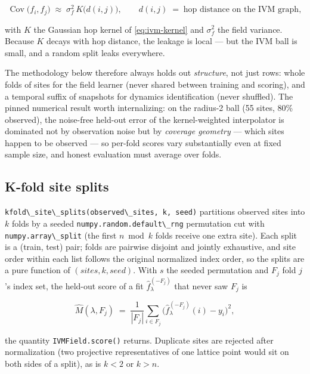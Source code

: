 \documentclass[
  10pt,
]{article}
\newcommand{\passthrough}[1]{#1}
\begin{document}
\begin{equation}
\label{eq:learn-correlation}
\operatorname{Cov}\bigl(f_i, f_j\bigr) \;\approx\; \sigma_f^{2}\,
K\bigl(d(i,j)\bigr),
\qquad d(i,j) \;=\; \text{hop distance on the IVM graph},
\end{equation}

with \(K\) the Gaussian hop kernel of \eqref{eq:ivm-kernel} and
\(\sigma_f^2\) the field variance. Because \(K\) decays with hop
distance, the leakage is local --- but the IVM ball is small, and a
random split leaks everywhere.

The methodology below therefore always holds out \emph{structure}, not
just rows: whole folds of sites for the field learner (never shared
between training and scoring), and a temporal suffix of snapshots for
dynamics identification (never shuffled). The pinned numerical result
worth internalizing: on the radius-2 ball (55 sites, 80\% observed), the
noise-free held-out error of the kernel-weighted interpolator is
dominated not by observation noise but by \emph{coverage geometry} ---
which sites happen to be observed --- so per-fold scores vary
substantially even at fixed sample size, and honest evaluation must
average over folds.

\subsection{K-fold site splits}\label{k-fold-site-splits}

\passthrough{\lstinline!kfold\_site\_splits(observed\_sites, k, seed)!}
partitions observed sites into \(k\) folds by a seeded
\passthrough{\lstinline!numpy.random.default\_rng!} permutation cut with
\passthrough{\lstinline!numpy.array\_split!} (the first \(n \bmod k\)
folds receive one extra site). Each split is a (train, test) pair; folds
are pairwise disjoint and jointly exhaustive, and site order within each
list follows the original normalized index order, so the splits are a
pure function of \((sites, k, seed)\). With \(s\) the seeded permutation
and \(F_j\) fold \(j\)'s index set, the held-out score of a fit
\(\hat{f}^{(-F_j)}_\lambda\) that never saw \(F_j\) is

\begin{equation}
\label{eq:learn-fold}
\widehat{M}(\lambda, F_j) \;=\; \frac{1}{|F_j|}
\sum_{i \in F_j}
\bigl( \hat{f}^{(-F_j)}_\lambda(i) - y_i \bigr)^{2},
\end{equation}

the quantity \passthrough{\lstinline!IVMField.score()!} returns.
Duplicate sites are rejected after normalization (two projective
representatives of one lattice point would sit on both sides of a
split), as is \(k < 2\) or \(k > n\).
\end{document}
